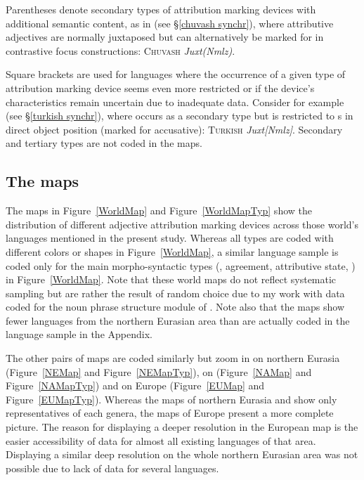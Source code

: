 Parentheses denote secondary types of attribution marking devices with additional semantic content, as in  (see \S\ref{chuvash synchr}), where attributive adjectives are normally juxtaposed but can alternatively be marked for  in contrastive focus constructions: \textsc{Chuvash} \textit{Juxt(Nmlz)}.

Square brackets are used for languages where the occurrence of a given type of attribution marking device seems even more restricted or if the device's characteristics remain uncertain due to inadequate data. Consider for example  (see \S\ref{turkish synchr}), where  occurs as a secondary type but is restricted to s in direct object position (marked for accusative): \textsc{Turkish} \textit{Juxt[Nmlz]}. 
Secondary and tertiary types are not coded in the maps. 

\subsection{The maps}
The maps in Figure~\ref{WorldMap} and Figure~\ref{WorldMapTyp} show the distribution of different adjective attribution marking devices across those world's languages mentioned in the present study. Whereas all types are coded with different colors or shapes in Figure~\ref{WorldMap}, a similar language sample is coded only for the main morpho-syntactic types (, agreement, attributive state, ) in Figure~\ref{WorldMap}. Note that these world maps do not reflect systematic sampling but are rather the result of random choice due to my work with data coded for the noun phrase structure module of  \citep{AUTOTYP-NP}. Note also that the maps show fewer languages from the northern Eurasian area than are actually coded in the language sample in the Appendix.

The other pairs of maps are coded similarly but zoom in on northern Eurasia (Figure~\ref{NEMap} and Figure~\ref{NEMapTyp}), on  (Figure~\ref{NAMap} and Figure~\ref{NAMapTyp}) and on Europe (Figure~\ref{EUMap} and Figure~\ref{EUMapTyp}). Whereas the maps of northern Eurasia and  show only representatives of each genera, the maps of Europe present a more complete picture. The reason for displaying a deeper resolution in the European map is the easier accessibility of data for almost all existing languages of that area. Displaying a similar deep resolution on the whole northern Eurasian area was not possible due to lack of data for several languages.


